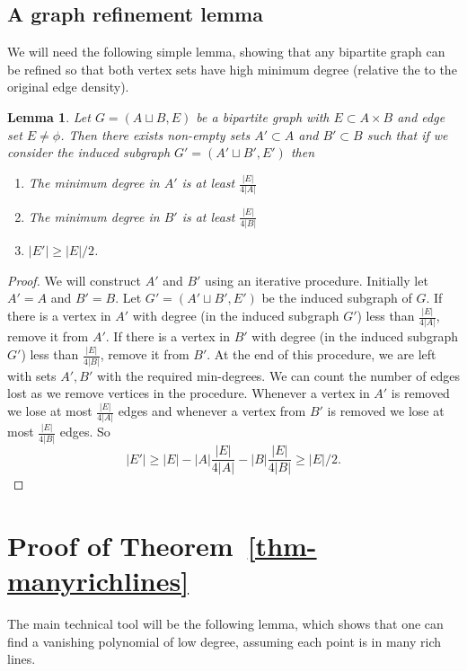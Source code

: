 \documentclass[11pt]{article}
\newtheorem{lem}[thm]{Lemma}
\begin{document}
\subsection{A graph refinement lemma}
We will need the following simple lemma, showing that any bipartite graph can be refined so that both vertex sets have high minimum degree  (relative the to the original edge density).
\begin{lem}\label{lem-refine}
Let $G=(A\sqcup B, E)$ be a bipartite graph with  $E \subset A \times B$ and edge set $E\ne \phi$. Then there exists non-empty sets $A'\subset A$ and $B'\subset B$ such that if we consider the induced subgraph $G'=(A'\sqcup B',E')$ then 
\begin{enumerate}
	\item The minimum degree in $A'$ is at least $\frac{|E|}{4|A|}$
	\item The minimum degree in $B'$ is at least $\frac{|E|}{4|B|}$
	\item $|E'|\ge |E|/2$.
\end{enumerate}
\end{lem}
\begin{proof}
We will construct $A'$ and $B'$ using an iterative procedure. Initially let $A'=A$ and $B'=B$. Let $G'=(A'\sqcup B',E')$ be the induced subgraph of $G$. If there is a vertex in $A'$ with degree (in the induced subgraph $G'$) less than $\frac{|E|}{4|A|}$, remove it from $A'$. If there is a vertex in $B'$ with degree (in the induced subgraph $G'$) less than $\frac{|E|}{4|B|}$, remove it from $B'$. At the end of this procedure, we are left with sets $A',B'$ with the required min-degrees.  We can count the number of edges lost as we remove vertices in the procedure. Whenever a vertex in $A'$ is removed we lose at most  $\frac{|E|}{4|A|}$ edges and whenever a vertex from $B'$ is removed we lose at most  $\frac{|E|}{4|B|}$ edges. So $$|E'|\ge |E|-|A|\frac{|E|}{4|A|}-|B|\frac{|E|}{4|B|}\ge |E|/2.$$
\end{proof}



\section{Proof of Theorem~\ref{thm-manyrichlines}}\label{sec-manyrichlines}

The main technical tool will be the following lemma, which shows that one can find a vanishing polynomial of low degree, assuming each point is in many rich lines. 
\end{document}
